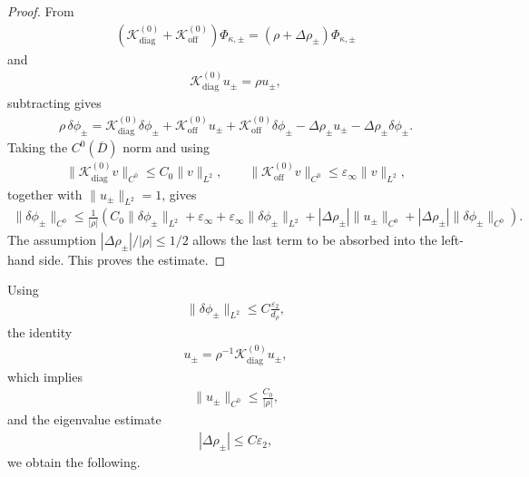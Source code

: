 \documentclass[10pt]{article}
\numberwithin{equation}{section}
\begin{document}
\begin{proof}
From
\begin{align*}
    (\mathcal{K}_{\mathrm{diag}}^{(0)}+\mathcal{K}_{\mathrm{off}}^{(0)})\Phi_{\kappa,\pm}
    =
    (\rho+\Delta\rho_\pm)\Phi_{\kappa,\pm}
\end{align*}
and
\begin{align*}
    \mathcal{K}_{\mathrm{diag}}^{(0)}u_\pm=\rho u_\pm,
\end{align*}
subtracting gives
\begin{align*}
    \rho\,\delta\phi_\pm
    =
    \mathcal{K}_{\mathrm{diag}}^{(0)}\delta\phi_\pm
    +
    \mathcal{K}_{\mathrm{off}}^{(0)}u_\pm
    +
    \mathcal{K}_{\mathrm{off}}^{(0)}\delta\phi_\pm
    -
    \Delta\rho_\pm u_\pm
    -
    \Delta\rho_\pm\delta\phi_\pm.
\end{align*}
Taking the $C^0(\overline D)$ norm and using
\begin{align*}
    \|\mathcal{K}_{\mathrm{diag}}^{(0)}v\|_{C^0}
    \leq
    C_0\|v\|_{L^2},
    \qquad
    \|\mathcal{K}_{\mathrm{off}}^{(0)}v\|_{C^0}
    \leq
    \varepsilon_\infty\|v\|_{L^2},
\end{align*}
together with $\|u_\pm\|_{L^2}=1$, gives
\begin{align*}
    \|\delta\phi_\pm\|_{C^0}
    \leq
    \frac{1}{|\rho|}
    \left(
    C_0\|\delta\phi_\pm\|_{L^2}
    +
    \varepsilon_\infty
    +
    \varepsilon_\infty\|\delta\phi_\pm\|_{L^2}
    +
    |\Delta\rho_\pm|\|u_\pm\|_{C^0}
    +
    |\Delta\rho_\pm|\|\delta\phi_\pm\|_{C^0}
    \right).
\end{align*}
The assumption $|\Delta\rho_\pm|/|\rho|\leq 1/2$ allows the last term to be absorbed into the left-hand side. This proves the estimate.
\end{proof}

Using
\begin{align*}
    \|\delta\phi_\pm\|_{L^2}
    \leq
    C\frac{\varepsilon_2}{d_\rho},
\end{align*}
the identity
\begin{align*}
    u_\pm = \rho^{-1} \mathcal{K}_{\mathrm{diag}}^{(0)} u_\pm,
\end{align*}
which implies
\begin{align*}
    \|u_\pm\|_{C^0}
    \leq
    \frac{C_0}{|\rho|},
\end{align*}
and the eigenvalue estimate
\begin{align*}
    |\Delta\rho_\pm|
    \leq
    C\varepsilon_2,
\end{align*}
we obtain the following.
\end{document}
